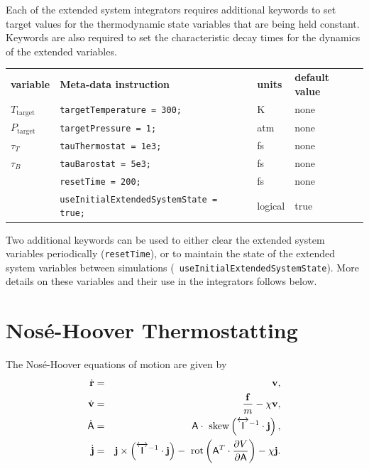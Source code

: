 \documentclass[]{book}
\begin{document}
Each of the extended system integrators requires additional keywords
to set target values for the thermodynamic state variables that are
being held constant.  Keywords are also required to set the
characteristic decay times for the dynamics of the extended
variables.

\begin{center}
\begin{tabular}{llll}
{\bf variable} & {\bf Meta-data instruction} & {\bf units} & {\bf
default value} \\  
$T_{\mathrm{target}}$ & {\tt targetTemperature = 300;} &  K & none \\
$P_{\mathrm{target}}$ & {\tt targetPressure = 1;} & atm & none \\
$\tau_T$ & {\tt tauThermostat = 1e3;} & fs & none \\
$\tau_B$ & {\tt tauBarostat = 5e3;} & fs  & none \\
         & {\tt resetTime = 200;} & fs & none \\
         & {\tt useInitialExtendedSystemState = true;} & logical &
true
\end{tabular}
\end{center}

Two additional keywords can be used to either clear the extended
system variables periodically ({\tt resetTime}), or to maintain the
state of the extended system variables between simulations ({\tt
useInitialExtendedSystemState}).  More details on these variables
and their use in the integrators follows below.

\section{\label{section:noseHooverThermo}Nos\'{e}-Hoover Thermostatting}

The Nos\'e-Hoover equations of motion are given by\cite{Hoover85}
\begin{eqnarray}
\dot{{\bf r}} & = & {\bf v}, \\
\dot{{\bf v}} & = & \frac{{\bf f}}{m} - \chi {\bf v} ,\\
\dot{\mathsf{A}} & = & \mathsf{A} \cdot
\mbox{ skew}\left(\overleftrightarrow{\mathsf{I}}^{-1} \cdot {\bf j}\right), \\
\dot{{\bf j}} & = & {\bf j} \times \left( \overleftrightarrow{\mathsf{I}}^{-1}
\cdot {\bf j} \right) - \mbox{ rot}\left(\mathsf{A}^{T} \cdot \frac{\partial
V}{\partial \mathsf{A}} \right) - \chi {\bf j}.
\label{eq:nosehoovereom}
\end{eqnarray}
\end{document}
